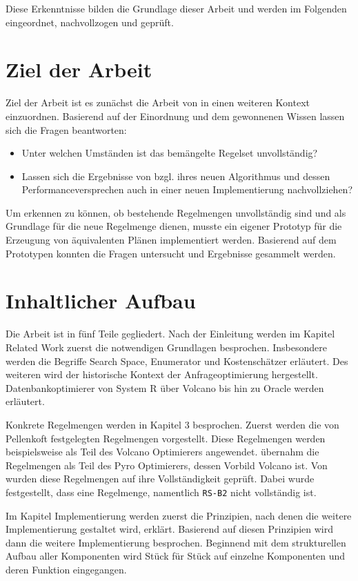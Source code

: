 Diese Erkenntnisse bilden die Grundlage dieser Arbeit und werden im Folgenden eingeordnet, nachvollzogen und geprüft.

\section{Ziel der Arbeit}

Ziel der Arbeit ist es zunächst die Arbeit von \cite{shanbhag2014optimizing} in einen weiteren Kontext einzuordnen. Basierend auf der Einordnung und dem gewonnenen Wissen lassen sich die Fragen beantworten:

\begin{itemize}
\item Unter welchen Umständen ist das bemängelte Regelset unvollständig? 
\item Lassen sich die Ergebnisse von \cite{shanbhag2014optimizing} bzgl. ihres neuen Algorithmus und dessen Performanceversprechen auch in einer neuen Implementierung nachvollziehen?
\end{itemize}

Um erkennen zu können, ob bestehende Regelmengen unvollständig sind und als Grundlage für die neue Regelmenge dienen,  musste ein eigener Prototyp für die Erzeugung von äquivalenten Plänen implementiert werden. Basierend auf dem Prototypen konnten die Fragen untersucht und Ergebnisse gesammelt werden.







\section{Inhaltlicher Aufbau}
Die Arbeit ist in fünf Teile gegliedert. Nach der Einleitung werden im Kapitel Related Work zuerst die notwendigen Grundlagen besprochen. Insbesondere werden die Begriffe Search Space, Enumerator und Kostenschätzer erläutert. Des weiteren wird der historische Kontext der Anfrageoptimierung hergestellt. Datenbankoptimierer von System R über Volcano bis hin zu Oracle werden erläutert. 

Konkrete Regelmengen werden in Kapitel 3 besprochen. Zuerst werden die von Pellenkoft festgelegten Regelmengen vorgestellt. Diese Regelmengen werden beispielsweise als Teil des Volcano Optimierers angewendet. \cite{roy2001multi} übernahm die Regelmengen als Teil des Pyro Optimierers, dessen Vorbild Volcano ist. Von \cite{shanbhag2014optimizing} wurden diese Regelmengen auf ihre Vollständigkeit geprüft. Dabei wurde festgestellt, dass eine Regelmenge, namentlich \texttt{RS-B2} nicht vollständig ist.

Im Kapitel Implementierung werden zuerst die Prinzipien,  nach denen die weitere Implementierung gestaltet wird, erklärt. Basierend auf diesen Prinzipien wird dann die weitere Implementierung besprochen. Beginnend mit dem strukturellen Aufbau aller Komponenten wird Stück für Stück auf einzelne Komponenten und deren Funktion eingegangen.


 
